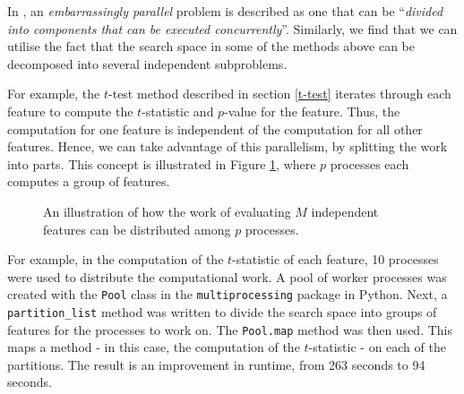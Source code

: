 \documentclass[12pt, twoside, a4paper]{report}
\begin{document}
In \cite{RefWorks:221}, an \textit{embarrassingly parallel} problem is described as one that can be ``\textit{divided into components that can be executed concurrently}''. Similarly, we find that we can utilise the fact that the search space in some of the methods above can be decomposed into several independent subproblems.

For example, the $t$-test method described in section \ref{t-test} iterates through each feature to compute the $t$-statistic and $p$-value for the feature. Thus, the computation for one feature is independent of the computation for all other features. Hence, we can take advantage of this parallelism, by splitting the work into parts. This concept is illustrated in Figure \ref{body:parallelism_diag}, where $p$ processes each computes a group of features.

\begin{figure}
\centering
{}
\caption{An illustration of how the work of evaluating $M$ independent features can be distributed among $p$ processes.}
\label{body:parallelism_diag}
\end{figure}


For example, in the computation of the $t$-statistic of each feature, 10 processes were used to distribute the computational work. A pool of worker processes was created with the \texttt{Pool} class in the \texttt{multiprocessing} package in Python. Next, a \texttt{partition\_list} method was written to divide the search space into groups of features for the processes to work on. The \texttt{Pool.map} method was then used. This maps a method - in this case, the computation of the $t$-statistic - on each of the partitions. The result is an improvement in runtime, from 263 seconds to 94 seconds.
\end{document}
